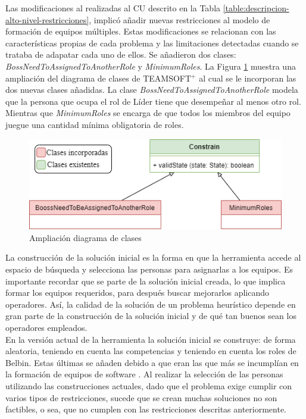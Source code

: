 Las modificaciones al realizadas al CU descrito en la Tabla \ref{table:descripcion-alto-nivel-restricciones}, implicó añadir nuevas restricciones al modelo de formación de equipos múltiples. Estas modificaciones se relacionan con las características propias de cada problema y las limitaciones detectadas cuando se trataba de adapatar cada uno de ellos. Se añadieron dos clases: \textit{BossNeedToAssignedToAnotherRole} y \textit{MinimumRoles}. La Figura \ref{fig:diagrama-clases-modificado} muestra una ampliación del diagrama de clases de TEAMSOFT$^+$ al cual se le incorporan las dos nuevas clases añadidas. La clase \textit{BossNeedToAssignedToAnotherRole} modela que la persona que ocupa el rol de Líder tiene que desempeñar al menos otro rol. Mientras que \textit{MinimumRoles} se encarga de que todos los miembros del equipo juegue una cantidad mínima obligatoria de roles. 

\begin{figure}[H]
	\centering
	\includegraphics[width=.7\textwidth]{figuras/diagramas-clases-a-incorporar.png}
	\caption{Ampliación diagrama de clases} \label{fig:diagrama-clases-modificado}
\end{figure}

La construcción de la solución inicial es la forma en que la herramienta accede al espacio de búsqueda y selecciona las personas para asignarlas a los equipos. Es importante recordar que se parte de la solución inicial creada, lo que implica formar los equipos requeridos, para después buscar mejorarlos aplicando operadores. Así, la calidad de la solución de un problema heurístico depende en gran parte de la construcción de la solución inicial y de qué tan buenos sean los operadores empleados. \\


En la versión actual de la herramienta la solución inicial se construye: de forma aleatoria, teniendo en cuenta las competencias y teniendo en cuenta los roles de Belbin. Estas últimas se añaden debido a que eran las que más se incumplían en la formación de equipos de software \cite{Duran2019}. Al realizar la selección de las personas utilizando las construcciones actuales, dado que el problema exige cumplir con varios tipos de restricciones, sucede que se crean muchas soluciones no son factibles, o sea, que no cumplen con las restricciones descritas anteriormente. \\

